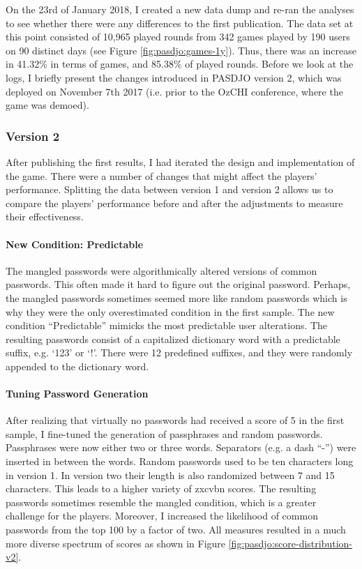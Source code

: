 On the 23rd of January 2018, I created a new data dump and re-ran the analyses to see whether there were any differences to the first publication. The data set at this point consisted of 10,965 played rounds from 342 games played by 190 users on 90 distinct days (see Figure \ref{fig:pasdjo:games-1y}). Thus, there was an increase in 41.32\% in terms of games, and 85.38\% of played rounds. Before we look at the logs, I briefly present the changes introduced in PASDJO version 2, which was deployed on November 7th 2017 (i.e. prior to the OzCHI conference, where the game was demoed).

\subsubsection{Version 2}
After publishing the first results, I had iterated the design and implementation of the game. There were a number of changes that might affect the players' performance. Splitting the data between version 1 and version 2 allows us to compare the players' performance before and after the adjustments to measure their effectiveness. 

\paragraph{New Condition: Predictable} The mangled passwords were algorithmically altered versions of common passwords. This often made it hard to figure out the original password. Perhaps, the mangled passwords sometimes seemed more like random passwords which is why they were the only overestimated condition in the first sample. The new condition ``Predictable'' mimicks the most predictable user alterations. The resulting passwords consist of a capitalized dictionary word with a predictable suffix, e.g. `123' or `!'. There were 12 predefined suffixes, and they were randomly appended to the dictionary word. 

\paragraph{Tuning Password Generation} After realizing that virtually no passwords had received a score of 5 in the first sample, I fine-tuned the generation of passphrases and random passwords. Passphrases were now either two or three words. Separators (e.g. a dash ``-'') were inserted in between the words. Random passwords used to be ten characters long in version 1. In version two their length is also randomized between 7 and 15 characters. This leads to a higher variety of zxcvbn scores. The resulting passwords sometimes resemble the mangled condition, which is a greater challenge for the players. Moreover, I increased the likelihood of common passwords from the top 100 by a factor of two. All measures resulted in a much more diverse spectrum of scores as shown in Figure \ref{fig:pasdjo:score-distribution-v2}.


